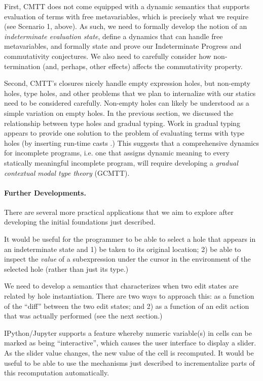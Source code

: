 First, CMTT does not come equipped with a dynamic semantics that supports evaluation of terms with free metavariables, which is precisely what we require (see Scenario 1, above). As such, we need to formally develop the notion of an \emph{indeterminate evaluation state}, define a dynamics that can handle free metavariables, and formally state and prove our Indeterminate Progress and commutativity conjectures. We also need to carefully consider how non-termination (and, perhaps, other effects) affects the commutativity property.

Second, CMTT's closures nicely handle empty expression holes, but non-empty holes, type holes, and other problems that we plan to internalize with our statics need to be considered carefully. Non-empty holes can likely be understood as a simple variation on empty holes. In the previous section, we discussed the relationship between type holes and gradual typing. Work in gradual typing appears to provide one solution to the problem of evaluating terms with type holes (by inserting run-time casts \cite{Siek06a}.) This suggests that a comprehensive dynamics for incomplete programs, i.e. one that assigns dynamic meaning to every statically meaningful incomplete program, will require developing a \emph{gradual contextual modal type theory} (GCMTT).

\paragraph{Further Developments.} There are several more practical applications that we aim to explore after developing the initial foundations just described.

It would be useful for the programmer to be able to select a hole that appears in an indeterminate state and 1) be taken to its original location; 2) be able to inspect the \emph{value} of a subexpression under the cursor in the environment of the selected hole (rather than just its type.)

We need to develop a semantics that characterizes when two edit states are related by hole instantiation. There are two ways to approach this: as a function of the ``diff'' between the two edit states; and 2) as a function of an edit action that was actually performed (see the next section.)

IPython/Jupyter \cite{Perez:2007:ISI:1251563.1251831} supports a feature whereby numeric variable(s) in cells can be marked as being ``interactive'', which causes the user interface to display a slider. As the slider value changes, the new value of the cell is recomputed. It would be useful to be able to use the mechanisms just described to incrementalize parts of this recomputation automatically.


